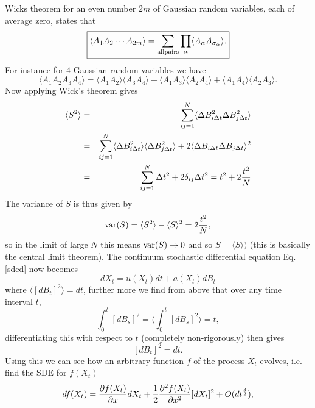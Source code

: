 \documentclass[11pt]{report}
\begin{document}
Wicks theorem for an even number $2m$ of Gaussian random variables, each of average zero, states that
\begin{equation}
\boxed{
\langle A_1A_2\cdots A_{2m}\rangle = \sum_{\rm all pairs} \prod_{\alpha}\langle A_{\alpha}A_{\sigma_\alpha}\rangle.}
\end{equation}
For instance for $4$ Gaussian random variables we have
\begin{equation}
\langle A_1A_2A_3A_4\rangle  = \langle A_1A_2\rangle \langle A_3A_4\rangle  + \langle A_1A_3\rangle  \langle A_2A_4\rangle + \langle A_1A_4\rangle \langle A_2A_3\rangle.
\end{equation}
Now applying Wick's theorem gives
\begin{eqnarray}
\langle S^2\rangle &=& \sum_{ij=1}^N \langle\Delta B_{i\Delta t}^2\Delta B_{j\Delta t}^2 \rangle \nonumber \\
&=&\sum_{ij=1}^N \langle\Delta B_{i\Delta t}^2\rangle \langle\Delta B_{j\Delta t}^2 \rangle+ 2 \langle\Delta B_{i\Delta t}\Delta B_{j\Delta t} \rangle^2 \nonumber \\
&=& \sum_{ij=1}^N \Delta t^2 + 2 \delta_{ij} \Delta t^2
= t^2  +  2 {t^2\over N}
\end{eqnarray}
The variance of $S$ is thus given by
\begin{equation}
{\rm var}(S)= \langle S^2\rangle - \langle S\rangle^2 = 2 {t^2\over N},
\end{equation}
so in the limit of large $N$ this means ${\rm var}(S)\to 0$ and so $S = \langle S\rangle)$
(this is basically the central limit theorem). 
The continuum stochastic differential equation Eq. \eqref{sded} now becomes
\begin{equation}
dX_t = u(X_t)dt  + a(X_t) dB_t
\end{equation}
where $\langle [dB_t]^2\rangle  = dt$, further more we find from above that over any time interval $t$,
\begin{equation}
\int_0^t [dB_s]^2 = \langle \int_0^t [dB_s]^2\rangle = t,
\end{equation}
differentiating this with respect to $t$ (completely non-rigorously) then gives
\begin{equation}
\boxed{
[dB_t]^2 = dt.}\label{ito}
\end{equation}
Using this we can see how an arbitrary function $f$ of the process $X_t$ evolves, i.e. find the SDE for $f(X_t)$
\begin{equation}
df(X_t) = {\partial f(X_t)\over \partial x} dX_t + {1\over 2} {\partial^2 f(X_t)\over \partial x^2}
[dX_t]^2 + O(dt^{3\over 2}),
\end{equation}
\end{document}
